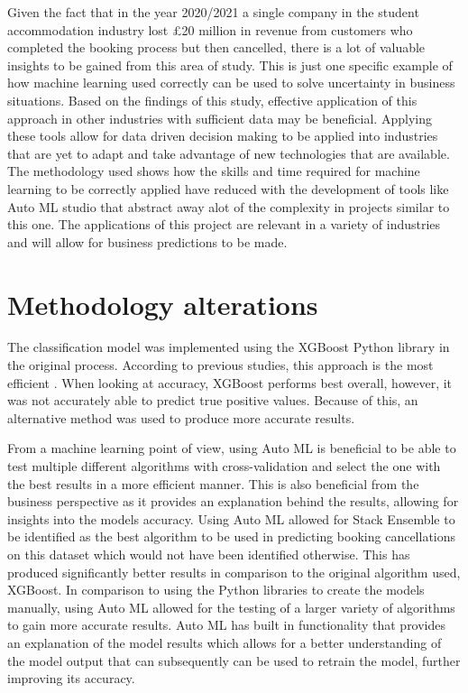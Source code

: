 Given the fact that in the year 2020/2021 a single company in the student accommodation industry lost £20 million in revenue from customers who completed the booking process but then cancelled, there is a lot of valuable insights to be gained from this area of study. This is just one specific example of how machine learning used correctly can be used to solve uncertainty in business situations. Based on the findings of this study, effective application of this approach in other industries with sufficient data may be beneficial. Applying these tools allow for data driven decision making to be applied into industries that are yet to adapt and take advantage of new technologies that are available. The methodology used shows how the skills and time required for machine learning to be correctly applied have reduced with the development of tools like Auto ML studio that abstract away alot of the complexity in projects similar to this one. The applications of this project are relevant in a variety of industries and will allow for business predictions to be made.

\section{Methodology alterations}
 
The classification model was implemented using the XGBoost Python library in the original process. According to previous studies, this approach is the most efficient \cite{Antonio2017PredictingRevenue}. When looking at accuracy, XGBoost performs best overall, however, it was not accurately able to predict true positive values. Because of this, an alternative method was used to produce more accurate results. 

\vspace{5mm}

From a machine learning point of view, using Auto ML is beneficial to be able to test multiple different algorithms with cross-validation and select the one with the best results in a more efficient manner. This is also beneficial from the business perspective as it provides an explanation behind the results, allowing for insights into the models accuracy. Using Auto ML allowed for Stack Ensemble to be identified as the best algorithm to be used in predicting booking cancellations on this dataset which would not have been identified otherwise. This has produced significantly better results in comparison to the original algorithm used, XGBoost. In comparison to using the Python libraries to create the models manually, using Auto ML allowed for the testing of a larger variety of algorithms to gain more accurate results. Auto ML has built in functionality that provides an explanation of the model results which allows for a better understanding of the model output that can subsequently can be used to retrain the model, further improving its accuracy.

